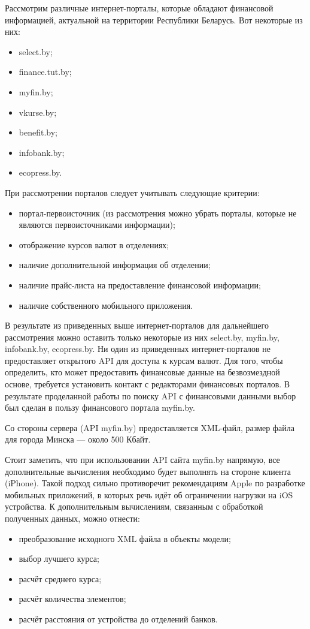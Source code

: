 \newpage

Рассмотрим различные интернет-порталы, которые обладают финансовой информацией,
актуальной на территории Республики Беларусь. Вот некоторые из них:
\begin{itemize}
  \item select.by;
  \item finance.tut.by;
  \item myfin.by;
  \item vkurse.by;
  \item benefit.by;
  \item infobank.by;
  \item ecopress.by.
\end{itemize}

При рассмотрении порталов следует учитывать следующие критерии:
\begin{itemize}
  \item портал-первоисточник (из рассмотрения можно убрать порталы,
    которые не являются первоисточниками информации);
  \item отображение курсов валют в отделениях;
  \item наличие дополнительной информация об отделении;
  \item наличие прайс-листа на предоставление финансовой информации;
  \item наличие собственного мобильного приложения.
\end{itemize}

В результате из приведенных выше интернет-порталов для дальнейшего
рассмотрения можно оставить только некоторые из них select.by, myfin.by,
infobank.by, ecopress.by. Ни один из приведенных интернет-порталов не
предоставляет открытого API для доступа к курсам валют. Для того, чтобы определить,
кто может предоставить финансовые данные на безвозмездной основе, требуется
установить контакт с редакторами финансовых порталов. В результате
проделанной работы по поиску API с финансовыми данными выбор был сделан в
пользу финансового портала myfin.by.

Со стороны сервера (API myfin.by) предоставляется XML-файл, размер файла для
города Минска --- около 500 Кбайт.

Стоит заметить, что при использовании API сайта myfin.by напрямую, все
дополнительные вычисления необходимо будет выполнять на стороне клиента (iPhone).
Такой подход сильно противоречит рекомендациям Apple по разработке
мобильных приложений, в которых речь идёт об ограничении нагрузки на iOS
устройства.
К дополнительным вычислениям, связанным с обработкой полученных данных, можно отнести:
\begin{itemize}
  \item преобразование исходного XML файла в объекты модели;
  \item выбор лучшего курса;
  \item расчёт среднего курса;
  \item расчёт количества элементов;
  \item расчёт расстояния от устройства до отделений банков.
\end{itemize}

